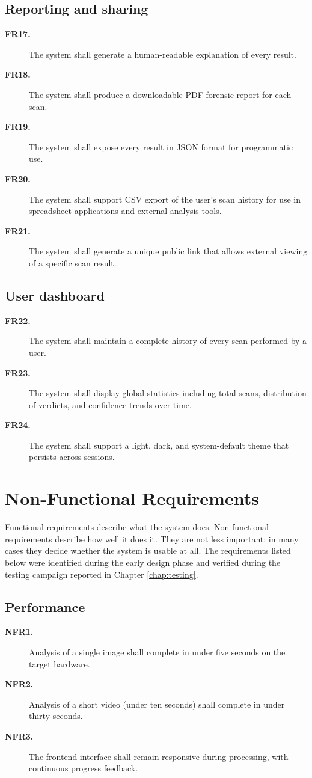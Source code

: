 \subsection*{Reporting and sharing}
\begin{description}
\item[\textbf{FR17.}] The system shall generate a human-readable explanation of every result.
\item[\textbf{FR18.}] The system shall produce a downloadable PDF forensic report for each scan.
\item[\textbf{FR19.}] The system shall expose every result in JSON format for programmatic use.
\item[\textbf{FR20.}] The system shall support CSV export of the user's scan history for use in spreadsheet applications and external analysis tools.
\item[\textbf{FR21.}] The system shall generate a unique public link that allows external viewing of a specific scan result.
\end{description}

\subsection*{User dashboard}
\begin{description}
\item[\textbf{FR22.}] The system shall maintain a complete history of every scan performed by a user.
\item[\textbf{FR23.}] The system shall display global statistics including total scans, distribution of verdicts, and confidence trends over time.
\item[\textbf{FR24.}] The system shall support a light, dark, and system-default theme that persists across sessions.
\end{description}

\section{Non-Functional Requirements}

Functional requirements describe what the system does. Non-functional requirements describe how well it does it. They are not less important; in many cases they decide whether the system is usable at all. The requirements listed below were identified during the early design phase and verified during the testing campaign reported in Chapter \ref{chap:testing}.

\subsection*{Performance}
\begin{description}
\item[\textbf{NFR1.}] Analysis of a single image shall complete in under five seconds on the target hardware.
\item[\textbf{NFR2.}] Analysis of a short video (under ten seconds) shall complete in under thirty seconds.
\item[\textbf{NFR3.}] The frontend interface shall remain responsive during processing, with continuous progress feedback.
\end{description}

